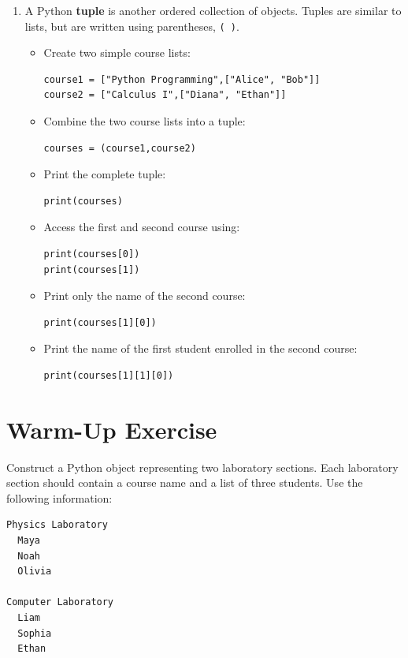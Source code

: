\documentclass{article}
\begin{document}
\begin{enumerate}

\item A Python \textbf{tuple} is another ordered collection of objects.  Tuples are similar to lists, but are written using parentheses, \texttt{( )}.

\begin{itemize}

\item Create two simple course lists:

\begin{verbatim}
course1 = ["Python Programming",["Alice", "Bob"]]
course2 = ["Calculus I",["Diana", "Ethan"]]
\end{verbatim}

\item Combine the two course lists into a tuple:

\begin{verbatim}
courses = (course1,course2)
\end{verbatim}

\item Print the complete tuple:

\begin{verbatim}
print(courses)
\end{verbatim}

\item Access the first and second course using:

\begin{verbatim}
print(courses[0])
print(courses[1])
\end{verbatim}
\vspace{0.25cm}

\item Print only the name of the second course:

\begin{verbatim}
print(courses[1][0])
\end{verbatim}
\vspace{0.25cm}

\item Print the name of the first student enrolled in the second course:

\begin{verbatim}
print(courses[1][1][0])
\end{verbatim}
\vspace{0.25cm}

\end{itemize}
\end{enumerate}


\section{Warm-Up Exercise}

Construct a Python object representing two laboratory sections.  Each laboratory section should contain a course name and a list of three students. Use the following information:

\begin{verbatim}
Physics Laboratory
  Maya
  Noah
  Olivia

Computer Laboratory
  Liam
  Sophia
  Ethan
\end{verbatim}
\end{document}
